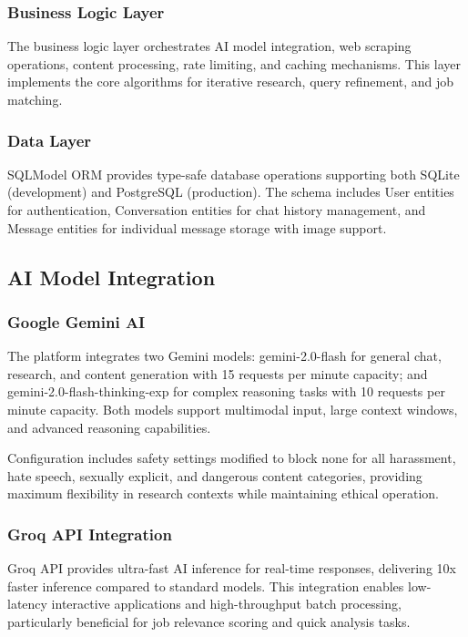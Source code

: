 \documentclass[conference]{IEEEtran}
\begin{document}
\subsubsection{Business Logic Layer}
The business logic layer orchestrates AI model integration, web scraping operations, content processing, rate limiting, and caching mechanisms. This layer implements the core algorithms for iterative research, query refinement, and job matching.

\subsubsection{Data Layer}
SQLModel ORM provides type-safe database operations supporting both SQLite (development) and PostgreSQL (production). The schema includes User entities for authentication, Conversation entities for chat history management, and Message entities for individual message storage with image support.

\subsection{AI Model Integration}

\subsubsection{Google Gemini AI}
The platform integrates two Gemini models: gemini-2.0-flash for general chat, research, and content generation with 15 requests per minute capacity; and gemini-2.0-flash-thinking-exp for complex reasoning tasks with 10 requests per minute capacity. Both models support multimodal input, large context windows, and advanced reasoning capabilities.

Configuration includes safety settings modified to block none for all harassment, hate speech, sexually explicit, and dangerous content categories, providing maximum flexibility in research contexts while maintaining ethical operation.

\subsubsection{Groq API Integration}
Groq API provides ultra-fast AI inference for real-time responses, delivering 10x faster inference compared to standard models. This integration enables low-latency interactive applications and high-throughput batch processing, particularly beneficial for job relevance scoring and quick analysis tasks.
\end{document}
